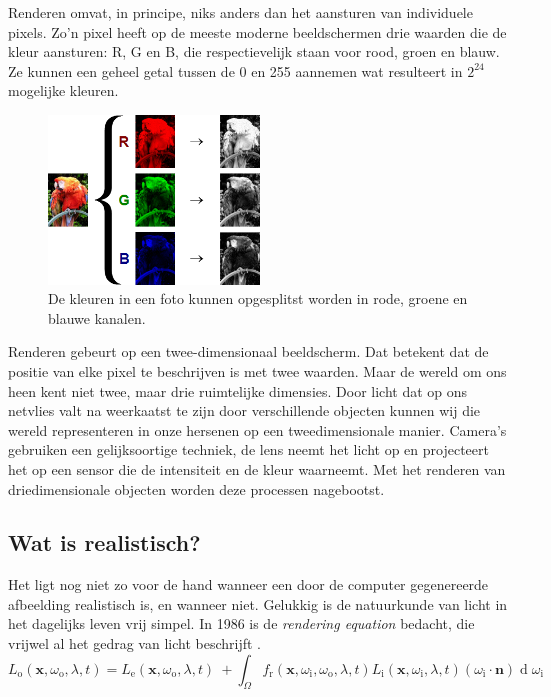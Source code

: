 \documentclass[12pt, a4paper]{article}
\begin{document}
Renderen omvat, in principe, niks anders dan het aansturen van individuele pixels. Zo'n pixel heeft op de meeste moderne beeldschermen drie waarden die de kleur aansturen: R, G en B, die respectievelijk staan voor rood, groen en blauw. Ze kunnen een geheel getal tussen de 0 en 255 aannemen wat resulteert in \(2^{24}\) mogelijke kleuren.
\begin{figure}[H]
\centering
\includegraphics[width=0.5\textwidth]{RGB_channels_separation.png}
\caption{De kleuren in een foto kunnen opgesplitst worden in rode, groene en blauwe kanalen.}
\label{fig:rgb_separated}
\end{figure}

Renderen gebeurt op een twee-dimensionaal beeldscherm. Dat betekent dat de positie van elke pixel te beschrijven is met twee waarden. Maar de wereld om ons heen kent niet twee, maar drie ruimtelijke dimensies. Door licht dat op ons netvlies valt na weerkaatst te zijn door verschillende objecten kunnen wij die wereld representeren in onze hersenen op een tweedimensionale manier. Camera's gebruiken een gelijksoortige techniek, de lens neemt het licht op en projecteert het op een sensor die de intensiteit en de kleur waarneemt. Met het renderen van driedimensionale objecten worden deze processen nagebootst. 

\subsection{Wat is realistisch?}
Het ligt nog niet zo voor de hand wanneer een door de computer gegenereerde afbeelding realistisch is, en wanneer niet. Gelukkig is de natuurkunde van licht in het dagelijks leven vrij simpel. In 1986 is de \textit{rendering equation} bedacht, die vrijwel al het gedrag van licht beschrijft \cite{RenderingEquation}.
\[
L_{\text{o}}(\mathbf x, \omega_{\text{o}}, \lambda, t) = L_{\text{e}}(\mathbf x, \omega_{\text{o}}, \lambda, t) \ + \int_\Omega f_{\text{r}}(\mathbf x, \omega_{\text{i}}, \omega_{\text{o}}, \lambda, t) L_{\text{i}}(\mathbf x, \omega_{\text{i}}, \lambda, t) (\omega_{\text{i}}\cdot\mathbf n) \operatorname d \omega_{\text{i}}
\]
\end{document}
